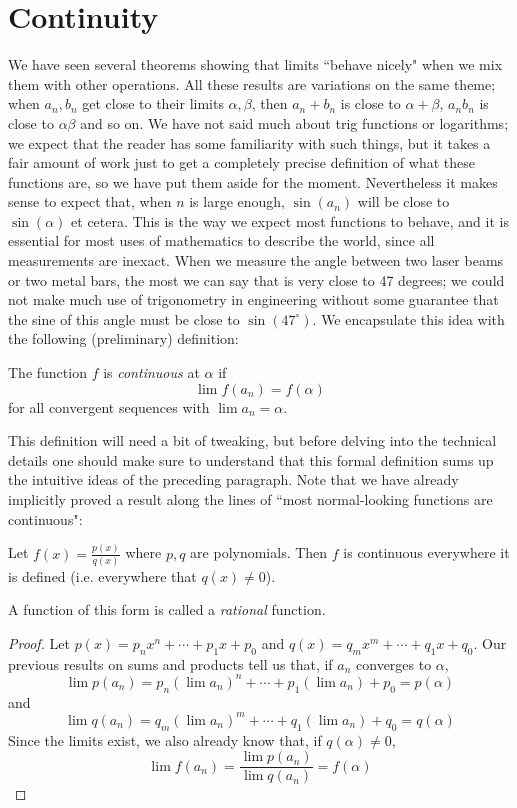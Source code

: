 \section{Continuity}
We have seen several theorems showing that limits ``behave nicely" when we mix them with other operations. All these results are variations on the same theme; when $a_n, b_n$ get close to their limits $\alpha, \beta$, then $a_n+b_n$ is close to $\alpha+\beta$, $a_nb_n$ is close to $\alpha\beta$ and so on. We have not said much about trig functions or logarithms; we expect that the reader has some familiarity with such things, but it takes a fair amount of work just to get a completely precise definition of what these functions are, so we have put them aside for the moment. Nevertheless it makes sense to expect that, when $n$ is large enough, $\sin(a_n)$ will be close to $\sin(\alpha)$ et cetera. This is the way we expect most functions to behave, and it is essential for most uses of mathematics to describe the world, since all measurements are inexact. When we measure the angle between two laser beams or two metal bars, the most we can say that is very close to 47 degrees; we could not make much use of trigonometry  in engineering without some guarantee that the sine of this angle must be close to $\sin(47^\circ)$. We encapsulate this idea with the following (preliminary) definition:

\begin{defn}\label{def:continuityPrelim}
The function $f$ is \emph{continuous} at $\alpha$ if
\[\lim f(a_n) = f(\alpha)\]
for all convergent sequences with $\lim a_n = \alpha$.
\end{defn}

This definition will need a bit of tweaking, but before delving into the technical details one should make sure  to understand that this formal definition sums up the intuitive ideas of the preceding paragraph. Note that we have already implicitly proved a result along the lines of ``most normal-looking functions are continuous":

\begin{thm}\label{thm:ratFunctsCont}
Let $f(x)=\frac{p(x)}{q(x)}$ where $p,q$ are polynomials. Then $f$ is continuous everywhere it is defined (i.e. everywhere that $q(x) \neq 0$).

A function of this form is called a  \emph{rational} function.
\end{thm}
\begin{proof}
Let $p(x) = p_nx^n + \cdots + p_1x + p_0$ and $q(x) = q_mx^m + \cdots + q_1x + q_0$.
Our previous results on sums and products tell us that, if $a_n$ converges to $\alpha$,
\[
\lim p(a_n) = p_n(\lim a_n)^n + \cdots + p_1(\lim a_n) + p_0 = p(\alpha)
\]
and
\[
\lim q(a_n) = q_m(\lim a_n)^m + \cdots + q_1(\lim a_n) + q_0 = q(\alpha)
\]
Since the limits exist, we also already know that, if $q(\alpha)\neq0$, 
\[
\lim f(a_n)=\frac{\lim p(a_n)}{\lim q(a_n)}=f(\alpha)
\]
\end{proof}

